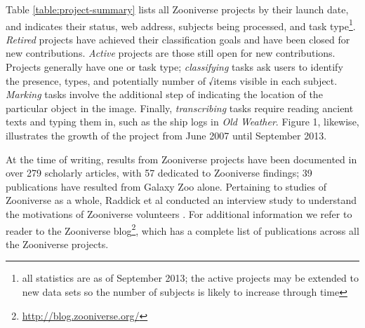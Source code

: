 \documentclass{sigchi}
\begin{document}

Table \ref{table:project-summary} lists all Zooniverse projects by their launch date, and indicates their status, web address, subjects being processed, and task type\footnote{all statistics are as of September 2013; the active projects may be extended to new data sets so the number of subjects is likely to increase through time}. \emph{Retired} projects have achieved their classification goals and have been closed for new contributions. \emph{Active} projects are those still open for new contributions.  Projects generally have one or task type; \emph{classifying} tasks ask users to identify the presence, types, and potentially number of √items visible in each subject.  \emph{Marking} tasks involve the additional step of indicating the location of the particular object in the image.  Finally, \emph{transcribing} tasks require reading ancient texts and typing them in, such as the ship logs in \emph{Old Weather}. Figure 1, likewise, illustrates the growth of the project from June 2007 until September 2013.  

At the time of writing, results from Zooniverse projects have been documented in over 279 scholarly articles, with 57  dedicated to Zooniverse findings; 39 publications have resulted from Galaxy Zoo alone.  Pertaining to studies of Zooniverse as a whole, Raddick et al conducted an interview study to understand the motivations of Zooniverse volunteers \cite{raddick2010galaxy}. For additional information we refer to reader to the Zooniverse blog\footnote{\url{http://blog.zooniverse.org/}}, which has a complete list of publications across all the Zooniverse projects.
\end{document}
